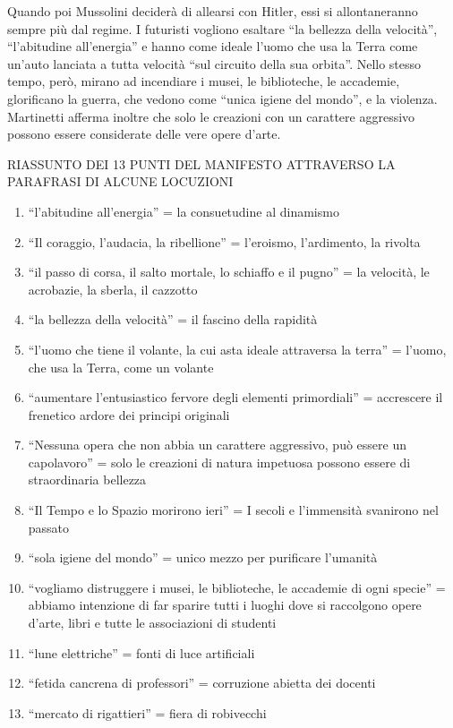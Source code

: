 \documentclass[10pt]{report}
\begin{document}
		Quando poi Mussolini deciderà di allearsi con Hitler, essi si allontaneranno sempre più dal regime. I futuristi vogliono esaltare “la bellezza della velocità”, “l'abitudine all'energia” e hanno come ideale l'uomo che usa la Terra come un'auto lanciata a tutta velocità “sul circuito della sua orbita”. Nello stesso tempo, però, mirano ad incendiare i musei, le biblioteche, le accademie, glorificano la guerra, che vedono come “unica igiene del mondo”, e la violenza. Martinetti afferma inoltre che solo le creazioni con un carattere aggressivo possono essere considerate delle vere opere d'arte.
		
		
		
		RIASSUNTO DEI 13 PUNTI DEL MANIFESTO ATTRAVERSO LA PARAFRASI DI ALCUNE LOCUZIONI 
		\begin{enumerate}
				
		\item 	“l'abitudine all'energia” = la consuetudine al dinamismo 
		\item “Il coraggio, l'audacia, la ribellione” = l'eroismo,	 l'ardimento, la rivolta 
		\item	“il passo di corsa, 
		 il salto mortale, lo schiaffo e il pugno” = la velocità, le acrobazie, la sberla, il cazzotto 
		\item	 “la bellezza della velocità” = il fascino della rapidità 
		\item “l'uomo che tiene il volante, la cui asta ideale attraversa la terra” = l'uomo, che usa la Terra, come un volante 
		\item “aumentare l'entusiastico fervore degli elementi primordiali” = accrescere il frenetico ardore dei principi originali 	
		\item	“Nessuna opera che non abbia un carattere aggressivo, può essere un capolavoro” = solo le creazioni di natura impetuosa possono essere di straordinaria bellezza 	\item“Il Tempo e lo Spazio morirono ieri” = I secoli e l'immensità svanirono nel passato	
		\item “sola igiene del mondo” = unico mezzo per purificare l'umanità 
		\item“vogliamo distruggere i musei, le biblioteche, le accademie di ogni specie” = abbiamo intenzione di far sparire tutti i luoghi dove si raccolgono opere d'arte, libri e tutte le associazioni di studenti
		\item “lune elettriche” = fonti di luce artificiali
		\item “fetida cancrena di professori” = corruzione abietta dei docenti 
		\item“mercato di rigattieri” = fiera di robivecchi
		
	\end{enumerate}
				
\end{document}
